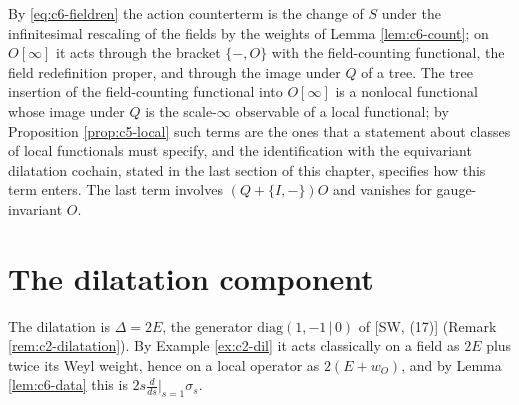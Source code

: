 \begin{remark}
\label{rem:c6-reading}
By \eqref{eq:c6-fieldren} the action counterterm is the change of $S$ under the infinitesimal rescaling of the fields by the weights of Lemma \ref{lem:c6-count}; on $O[\infty]$ it acts through the bracket $\{-,O\}$ with the field-counting functional, the field redefinition proper, and through the image under $Q$ of a tree. The tree insertion of the field-counting functional into $O[\infty]$ is a nonlocal functional whose image under $Q$ is the scale-$\infty$ observable of a local functional; by Proposition \ref{prop:c5-local} such terms are the ones that a statement about classes of local functionals must specify, and the identification with the equivariant dilatation cochain, stated in the last section of this chapter, specifies how this term enters. The last term involves $(Q+\{I,-\})O$ and vanishes for gauge-invariant $O$.
\end{remark}

\section{The dilatation component}

The dilatation is $\Delta=2E$, the generator $\mathrm{diag}(1,-1\,|\,0)$ of [SW, (17)] (Remark \ref{rem:c2-dilatation}). By Example \ref{ex:c2-dil} it acts classically on a field as $2E$ plus twice its Weyl weight, hence on a local operator as $2(E+w_O)$, and by Lemma \ref{lem:c6-data} this is $2s\frac{d}{ds}\big|_{s=1}\sigma_s$.

